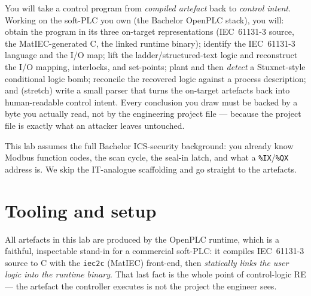 \documentclass[11pt,a4paper]{article}
\begin{document}
\labheader

\begin{goalbox}
You will take a control program from \emph{compiled artefact} back to
\emph{control intent}. Working on the soft-PLC you own (the Bachelor
OpenPLC stack), you will: obtain the program in its three on-target
representations (IEC~61131-3 source, the MatIEC-generated C, the linked
runtime binary); identify the IEC~61131-3 language and the I/O map; lift
the ladder/structured-text logic and reconstruct the I/O mapping,
interlocks, and set-points; plant and then \emph{detect} a Stuxnet-style
conditional logic bomb; reconcile the recovered logic against a process
description; and (stretch) write a small parser that turns the on-target
artefacts back into human-readable control intent. Every conclusion you
draw must be backed by a byte you actually read, not by the engineering
project file --- because the project file is exactly what an attacker
leaves untouched.
\end{goalbox}

\begin{notebox}
This lab assumes the full Bachelor ICS-security background: you already
know Modbus function codes, the scan cycle, the seal-in latch, and what a
\texttt{\%IX}/\texttt{\%QX} address is. We skip the IT-analogue scaffolding
and go straight to the artefacts.
\end{notebox}

\section*{Tooling and setup}

All artefacts in this lab are produced by the OpenPLC runtime, which is a
faithful, inspectable stand-in for a commercial soft-PLC: it compiles
IEC~61131-3 source to C with the \texttt{iec2c} (MatIEC) front-end, then
\emph{statically links the user logic into the runtime binary}. That last
fact is the whole point of control-logic RE --- the artefact the controller
executes is not the project the engineer sees.
\end{document}
